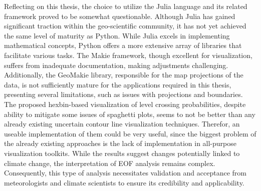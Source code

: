 %
%

Reflecting on this thesis, the choice to utilize the Julia language and its related framework proved to be somewhat questionable. Although Julia has gained significant traction within the geo-scientific community, it has not yet achieved the same level of maturity as Python. 
While Julia excels in implementing mathematical concepts, Python offers a more extensive array of libraries that facilitate various tasks.
The Makie framework, though excellent for visualization, suffers from inadequate documentation, making adjustments challenging. 
Additionally, the GeoMakie library, responsible for the map projections of the data, is not sufficiently mature for the applications required in this thesis, presenting several limitations, such as issues with projections and boundaries.
The proposed hexbin-based visualization of level crossing probabilities, despite ability to mitigate some issues of spaghetti plots, seems to not be better than any already existing uncertain contour line visualization techniques.
Therefor, an useable implementation of them could be very useful, since the biggest problem of the already existing approaches is the lack of implementation in all-purpose visualization toolkits.
While the results suggest changes potentially linked to climate change, the interpretation of EOF analysis remains complex. 
Consequently, this type of analysis necessitates validation and acceptance from meteorologists and climate scientists to ensure its credibility and applicability.


